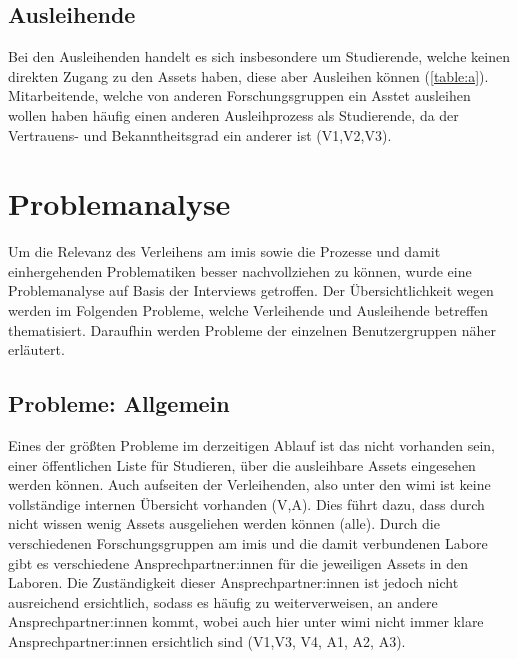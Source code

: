 \subsection*{Ausleihende}
Bei den Ausleihenden handelt es sich insbesondere um Studierende, welche keinen direkten Zugang zu
den Assets haben, diese aber Ausleihen können (\ref{table:a}). Mitarbeitende, welche von anderen
Forschungsgruppen ein Asstet ausleihen wollen haben häufig einen anderen Ausleihprozess als
Studierende, da der Vertrauens- und Bekanntheitsgrad ein anderer ist (V1,V2,V3).



\section{Problemanalyse}
\label{section:iststand}
        
Um die Relevanz des Verleihens am \ac{imis} sowie die Prozesse und damit einhergehenden
Problematiken besser nachvollziehen zu können, wurde eine Problemanalyse auf Basis der Interviews
getroffen. Der Übersichtlichkeit wegen werden im Folgenden Probleme, welche Verleihende und
Ausleihende betreffen thematisiert. Daraufhin werden Probleme der einzelnen Benutzergruppen
näher erläutert.

\subsection*{Probleme: Allgemein}
\label{section:probleme-allgemein}
Eines der größten Probleme im derzeitigen Ablauf ist das nicht vorhanden sein, einer öffentlichen
Liste für Studieren, über die ausleihbare Assets eingesehen werden können. Auch aufseiten der
Verleihenden, also unter den \ac{wimi} ist keine vollständige internen Übersicht vorhanden (V,A).
Dies führt dazu, dass durch nicht wissen wenig Assets ausgeliehen werden können (alle). Durch die
verschiedenen Forschungsgruppen am \ac{imis} und die damit verbundenen Labore gibt es verschiedene
Ansprechpartner:innen für die jeweiligen Assets in den Laboren. Die Zuständigkeit dieser
Ansprechpartner:innen ist jedoch nicht ausreichend ersichtlich, sodass es häufig zu weiterverweisen,
an andere Ansprechpartner:innen kommt, wobei auch hier unter \ac{wimi} nicht immer klare
Ansprechpartner:innen ersichtlich sind (V1,V3, V4, A1, A2, A3). 

